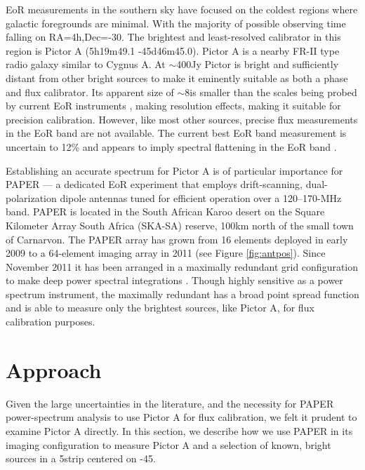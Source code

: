 \documentclass[preprint]{aastex}
\begin{document}

EoR measurements in the southern sky have focused on the coldest regions where
galactic foregrounds are minimal. With the majority of possible observing time falling on 
RA=4h,Dec=-30. The brightest and least-resolved calibrator in this region is Pictor A 
(5h19m49.1 -45d46m45.0). Pictor A is a nearby FR-II type radio galaxy 
 similar to Cygnus A.  At $\sim$400Jy Pictor is bright and sufficiently distant from other 
bright sources to make it eminently suitable as both a phase and flux calibrator. Its apparent
size of $\sim$8\arcmin is smaller than the scales being probed by current EoR instruments , 
making resolution effects, making it suitable for precision calibration.  However, 
like most other sources, precise flux measurements in the EoR band are not available.
The current best EoR band measurement
is uncertain to 12\% and appears to imply spectral flattening in the EoR band
\citep{Perley:1997p9312}. 
 
Establishing an accurate spectrum for Pictor A is of particular importance for
PAPER --- a dedicated EoR experiment 
that employs drift-scanning, dual-polarization dipole antennas 
tuned for efficient operation over a 120--170-MHz band.  PAPER is located in the South African Karoo desert
on the Square Kilometer Array
South Africa (SKA-SA) reserve, 100km north of the small town of Carnarvon.
The PAPER array has grown from 16 elements deployed in early 2009 to a
64-element imaging array in 2011 (see Figure \ref{fig:antpos}). 
Since November 2011 it has been arranged in a maximally redundant grid 
configuration to make deep power spectral integrations \citep{Parsons:2012a}.
Though highly sensitive as a power spectrum instrument, the maximally redundant
has a broad point spread function and is able to measure only the brightest sources,
like Pictor A, for flux calibration purposes.  



\section{Approach}
\label{sec:approach}
Given the large uncertainties in the literature, and the necessity for PAPER power-spectrum analysis
to use Pictor A for flux calibration, we felt it prudent to examine Pictor A directly.
In this section, we describe how we use PAPER in its imaging configuration
to measure Pictor A and a selection of known, bright sources in a 5\arcdeg strip centered
on -45\arcdeg. 
\end{document}
